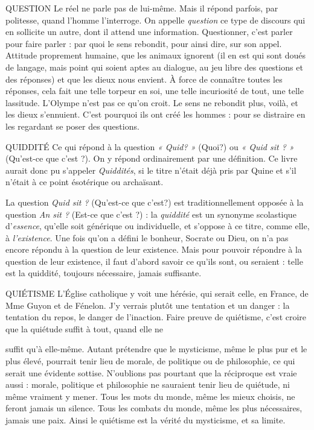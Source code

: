 QUESTION Le réel ne parle pas de lui-même. Mais il répond parfois, par
politesse, quand l’homme l’interroge. On appelle {\it question} ce
type de discours qui en sollicite un autre, dont il attend une information.
Questionner, c’est parler pour faire parler : par quoi le sens rebondit, pour ainsi
dire, sur son appel. Attitude proprement humaine, que les animaux ignorent (il
en est qui sont doués de langage, mais point qui soient aptes au dialogue, au jeu
libre des questions et des réponses) et que les dieux nous envient. À force de
connaître toutes les réponses, cela fait une telle torpeur en soi, une telle incuriosité
de tout, une telle lassitude. L’Olympe n’est pas ce qu’on croit. Le sens
ne rebondit plus, voilà, et les dieux s’ennuient. C’est pourquoi ils ont créé les
hommes : pour se distraire en les regardant se poser des questions.

QUIDDITÉ Ce qui répond à la question {\it « Quid? »} (Quoi?) ou {\it « Quid
sit ? »} (Qu'est-ce que c’est ?). On y répond ordinairement par
une définition. Ce livre aurait donc pu s'appeler {\it Quiddités}, si le titre n’était déjà
pris par Quine et s’il n’était à ce point ésotérique ou archaïsant.

La question {\it Quid sit ?} (Qu'est-ce que c’est?) est traditionnellement
opposée à la question {\it An sit ?} (Est-ce que c’est ?) : la {\it quiddité} est un synonyme
scolastique d’{\it essence}, qu’elle soit générique ou individuelle, et s'oppose à ce
titre, comme elle, à {\it l'existence}. Une fois qu’on a défini le bonheur, Socrate ou
Dieu, on n'a pas encore répondu à la question de leur existence. Mais pour
pouvoir répondre à la question de leur existence, il faut d’abord savoir ce qu'ils
sont, ou seraient : telle est la quiddité, toujours nécessaire, jamais suffisante.

QUIÉTISME L'Église catholique y voit une hérésie, qui serait celle, en
France, de Mme Guyon et de Fénelon. J'y verrais plutôt une
tentation et un danger : la tentation du repos, le danger de l’inaction. Faire
preuve de quiétisme, c’est croire que la quiétude suffit à tout, quand elle ne

suffit qu’à elle-même. Autant prétendre que le mysticisme, même le plus pur et
le plus élevé, pourrait tenir lieu de morale, de politique ou de philosophie, ce
qui serait une évidente sottise. N'oublions pas pourtant que la réciproque est
vraie aussi : morale, politique et philosophie ne sauraient tenir lieu de quiétude,
ni même vraiment y mener. Tous les mots du monde, même les mieux choisis,
ne feront jamais un silence. Tous les combats du monde, même les plus nécessaires,
jamais une paix. Ainsi le quiétisme est la vérité du mysticisme, et sa
limite.


